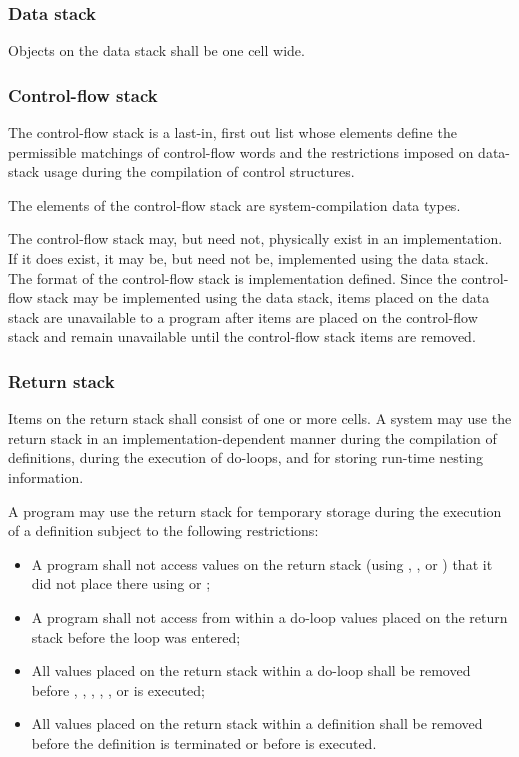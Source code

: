 \subsubsection{Data stack} %
\label{usage:datastack}

Objects on the data stack shall be one cell wide.

\subsubsection{Control-flow stack} %
\label{usage:controlstack}

The control-flow stack is a last-in, first out list whose elements
define the permissible matchings of control-flow words and the
restrictions imposed on data-stack usage during the compilation of
control structures.

The elements of the control-flow stack are system-compilation data
types.

The control-flow stack may, but need not, physically exist in an
implementation. If it does exist, it may be, but need not be,
implemented using the data stack. The format of the control-flow
stack is implementation defined. Since the control-flow stack may
be implemented using the data stack, items placed on the data stack
are unavailable to a program after items are placed on the
control-flow stack and remain unavailable until the control-flow
stack items are removed.

\subsubsection{Return stack} %
\label{usage:returnstack}

Items on the return stack shall consist of one or more cells. A
system may use the return stack in an implementation-dependent
manner during the compilation of definitions, during the execution
of do-loops, and for storing run-time nesting information.

A program may use the return stack for temporary storage during the
execution of a definition subject to the following restrictions:

\begin{itemize}
\item A program shall not access values on the return stack
	(using , ,  or )
	that it did not place there using  or ;

\item A program shall not access from within a do-loop values
	placed on the return stack before the loop was entered;

\item All values placed on the return stack within a do-loop
	shall be removed before , , ,
	, , or  is executed;

\item All values placed on the return stack within a definition
	shall be removed before the definition is terminated or
	before  is executed.
\end{itemize}


